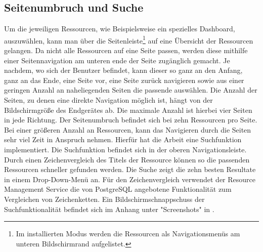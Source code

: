 \subsection{Seitenumbruch und Suche}
\label{subsec:seitenumbruchundsuche}
Um die jeweiligen Ressourcen, wie Beispielsweise ein spezielles Dashboard, auszuwählen, kann man über
die Seitenleiste\footnote{Im installierten Modus werden die Ressourcen als Navigationsmenüs am unteren Bildschirmrand aufgelistet.}
auf eine Übersicht der Ressourcen gelangen. Da nicht alle Ressourcen auf eine Seite passen, werden diese mithilfe
einer Seitennavigation am unteren ende der Seite zugänglich gemacht. Je nachdem, wo sich der Benutzer befindet,
kann dieser so ganz an den Anfang, ganz an das Ende, eine Seite vor, eine Seite zurück navigieren sowie aus einer geringen Anzahl
an naheliegenden Seiten die passende auswählen. Die Anzahl der Seiten, zu denen eine direkte Navigation möglich ist, hängt von
der Bildschirmgröße des Endgerätes ab. Die maximale Anzahl ist hierbei vier Seiten in jede Richtung. Der Seitenumbruch befindet sich
bei zehn Ressourcen pro Seite. Bei einer größeren Anzahl an Ressourcen, kann das Navigieren durch
die Seiten sehr viel Zeit in Anspruch nehmen. Hierfür hat die Arbeit eine Suchfunktion implementiert. Die Suchfunktion befindet sich
in der oberen Navigationsleiste. Durch einen Zeichenvergleich des Titels der Ressource können so die passenden Ressourcen schneller gefunden
werden. Die Suche zeigt die zehn besten Resultate in einem Drop-Down-Menü an. Für den Zeichenvergleich verwendet der Resource Management Service
die von PostgreSQL angebotene Funktionalität zum Vergleichen von Zeichenketten. Ein Bildschirmschnappschuss der Suchfunktionalität befindet sich
im Anhang unter "Screenshots" in .

